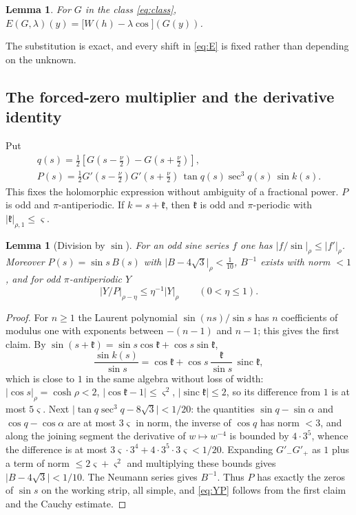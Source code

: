 \documentclass[11pt]{amsart}
\numberwithin{equation}{section}
\newtheorem{lemma}[theorem]{Lemma}
\theoremstyle{definition}
\theoremstyle{remark}
\newcommand{\abs}[1]{\lvert #1\rvert}
\begin{document}
\begin{lemma}\label{lem:Esubst}
For $G$ in the class \eqref{eq:class}, $E(G,\lambda)(y)=\bigl[W(h)-\lambda\cos\bigr](G(y))$.
\end{lemma}

The substitution is exact, and every shift in \eqref{eq:E} is fixed rather than depending on the unknown.

\subsection{The forced-zero multiplier and the derivative identity}
Put
\begin{equation}\label{eq:P}
\begin{gathered}
q(s)=\tfrac12[G(s-\tfrac\nu2)-G(s+\tfrac\nu2)],\\
P(s)=\tfrac12G'(s-\tfrac\nu2)G'(s+\tfrac\nu2)\,\tan q(s)\sec^3q(s)\,\sin k(s).
\end{gathered}
\end{equation}
This fixes the holomorphic expression without ambiguity of a fractional power. $P$ is odd and $\pi$-antiperiodic. If $k=s+\mathfrak k$, then $\mathfrak k$ is odd and $\pi$-periodic with $\abs{\mathfrak k}_{\rho,1}\le\varsigma$.

\begin{lemma}[Division by $\sin$]\label{lem:sinquot}
For an odd sine series $f$ one has $\abs{f/\sin}_\rho\le\abs{f'}_\rho$. Moreover $P(s)=\sin s\,B(s)$ with $\abs{B-4\sqrt3}_\rho<\tfrac1{10}$, $B^{-1}$ exists with norm $<1$, and for odd $\pi$-antiperiodic $Y$
\begin{equation}\label{eq:YP}
\abs{Y/P}_{\rho-\eta}\le\eta^{-1}\abs Y_\rho\qquad(0<\eta\le1).
\end{equation}
\end{lemma}

\begin{proof}
For $n\ge1$ the Laurent polynomial $\sin(ns)/\sin s$ has $n$ coefficients of modulus one with exponents between $-(n-1)$ and $n-1$; this gives the first claim. By $\sin(s+\mathfrak k)=\sin s\cos\mathfrak k+\cos s\sin\mathfrak k$,
\[
\frac{\sin k(s)}{\sin s}=\cos\mathfrak k+\cos s\,\frac{\mathfrak k}{\sin s}\,\operatorname{sinc}\mathfrak k ,
\]
which is close to $1$ in the same algebra without loss of width: $\abs{\cos s}_\rho=\cosh\rho<2$, $\abs{\cos\mathfrak k-1}\le\varsigma^2$, $\abs{\operatorname{sinc}\mathfrak k}\le2$, so its difference from $1$ is at most $5\varsigma$. Next $\abs{\tan q\sec^3q-8\sqrt3}<1/20$: the quantities $\sin q-\sin\alpha$ and $\cos q-\cos\alpha$ are at most $3\varsigma$ in norm, the inverse of $\cos q$ has norm $<3$, and along the joining segment the derivative of $w\mapsto w^{-4}$ is bounded by $4\cdot3^5$, whence the difference is at most $3\varsigma\cdot3^4+4\cdot3^5\cdot3\varsigma<1/20$. Expanding $G'_-G'_+$ as $1$ plus a term of norm $\le2\varsigma+\varsigma^2$ and multiplying these bounds gives $\abs{B-4\sqrt3}<1/10$. The Neumann series gives $B^{-1}$. Thus $P$ has exactly the zeros of $\sin s$ on the working strip, all simple, and \eqref{eq:YP} follows from the first claim and the Cauchy estimate.
\end{proof}
\end{document}
